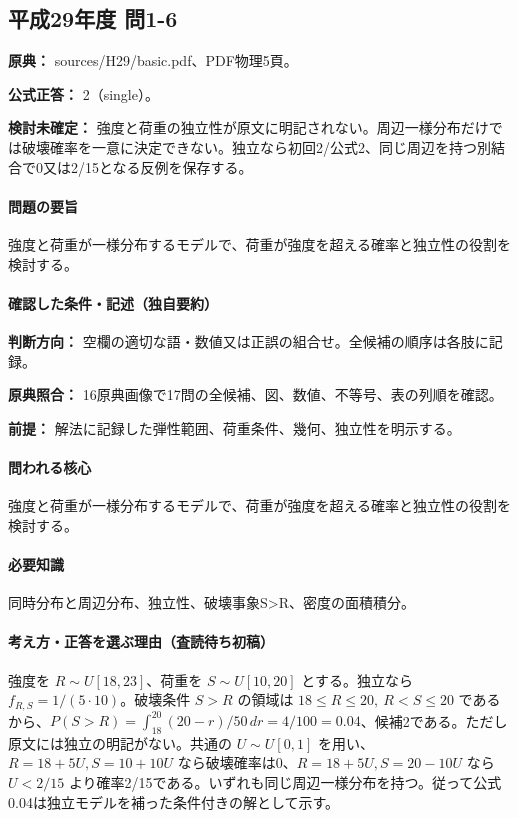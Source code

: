 \subsection{平成29年度 問1-6}
\label{q:h29-reg-basic-1-6}

\noindent\textbf{原典：} sources/H29/basic.pdf、PDF物理5頁。

\textbf{公式正答：} 2（single）。

\par\textbf{検討未確定：} 強度と荷重の独立性が原文に明記されない。周辺一様分布だけでは破壊確率を一意に決定できない。独立なら初回2/公式2、同じ周辺を持つ別結合で0又は2/15となる反例を保存する。

\paragraph{問題の要旨} 強度と荷重が一様分布するモデルで、荷重が強度を超える確率と独立性の役割を検討する。

\paragraph{確認した条件・記述（独自要約）}\mbox{}\par

\noindent\textbf{判断方向：} 空欄の適切な語・数値又は正誤の組合せ。全候補の順序は各肢に記録。\par

\noindent\textbf{原典照合：} 16原典画像で17問の全候補、図、数値、不等号、表の列順を確認。\par

\noindent\textbf{前提：} 解法に記録した弾性範囲、荷重条件、幾何、独立性を明示する。\par

\paragraph{問われる核心} 強度と荷重が一様分布するモデルで、荷重が強度を超える確率と独立性の役割を検討する。

\paragraph{必要知識} 同時分布と周辺分布、独立性、破壊事象S>R、密度の面積積分。

\paragraph{考え方・正答を選ぶ理由（査読待ち初稿）} 強度を \(R\sim U[18,23]\)、荷重を \(S\sim U[10,20]\) とする。独立なら \(f_{R,S}=1/(5\cdot10)\)。破壊条件 \(S>R\) の領域は \(18\le R\le20,\ R<S\le20\) であるから、\(P(S>R)=\int_{18}^{20}(20-r)/50\,dr=4/100=0.04\)、候補2である。ただし原文には独立の明記がない。共通の \(U\sim U[0,1]\) を用い、\(R=18+5U,S=10+10U\) なら破壊確率は0、\(R=18+5U,S=20-10U\) なら \(U<2/15\) より確率2/15である。いずれも同じ周辺一様分布を持つ。従って公式0.04は独立モデルを補った条件付きの解として示す。

